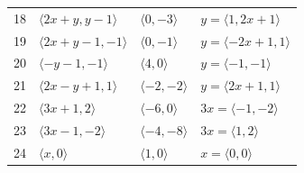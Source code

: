 \documentclass[11pt]{article}
\begin{document}
\begin{longtable}{@{}rlll@{}}
18 & $\langle 2x+y,y-1\rangle$ & $\langle 0,-3\rangle$ & $y=\langle 1,2x+1\rangle$\\
19 & $\langle 2x+y-1,-1\rangle$ & $\langle 0,-1\rangle$ & $y=\langle -2x+1,1\rangle$\\
20 & $\langle -y-1,-1\rangle$ & $\langle 4,0\rangle$ & $y=\langle -1,-1\rangle$\\
21 & $\langle 2x-y+1,1\rangle$ & $\langle -2,-2\rangle$ & $y=\langle 2x+1,1\rangle$\\
22 & $\langle 3x+1,2\rangle$ & $\langle -6,0\rangle$ & $3x=\langle -1,-2\rangle$\\
23 & $\langle 3x-1,-2\rangle$ & $\langle -4,-8\rangle$ & $3x=\langle 1,2\rangle$\\
24 & $\langle x,0\rangle$ & $\langle 1,0\rangle$ & $x=\langle 0,0\rangle$\\
\end{longtable}
\endgroup
\end{document}
